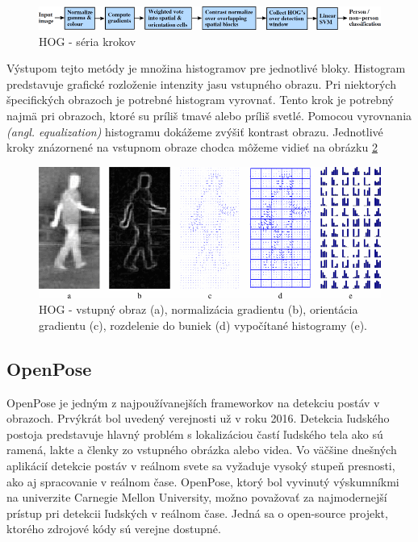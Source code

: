 \documentclass[slovak,master,dept460,male,cpp,cpdeclaration]{diploma}
\begin{document}
\begin{figure}[H]
	\centering
	\includegraphics[width=1\textwidth]{Figures/hog.png}
	\caption{HOG - séria krokov \cite{dalal2005}}
	\label{fig:HOG1}
\end{figure}

Výstupom tejto metódy je množina histogramov pre jednotlivé bloky. Histogram predstavuje grafické rozloženie intenzity jasu vstupného obrazu. Pri niektorých špecifických obrazoch je potrebné histogram vyrovnať. Tento krok je potrebný najmä pri obrazoch, ktoré su príliš tmavé alebo príliš svetlé. Pomocou vyrovnania \textit{(angl. equalization)} histogramu  dokážeme zvýšiť kontrast obrazu. Jednotlivé kroky znázornené na vstupnom obraze chodca môžeme vidieť na obrázku \ref{fig:HOG2}\par


\begin{figure}[H]
	\centering
	\includegraphics[width=1\textwidth]{Figures/hog3.png}
	\caption{HOG - vstupný obraz (a), normalizácia gradientu (b), orientácia gradientu (c), rozdelenie do buniek (d) vypočítané histogramy (e). \cite{bertozzi2007pedestrian}}
	\label{fig:HOG2}
\end{figure}


\newpage
\subsection{OpenPose}
OpenPose\cite{cao2018openpose} je jedným z najpoužívanejších frameworkov na detekciu postáv v obrazoch. Prvýkrát bol uvedený verejnosti už v roku 2016. Detekcia ľudského postoja predstavuje hlavný problém s lokalizáciou častí ľudského tela ako sú ramená, lakte a členky zo vstupného obrázka alebo videa. Vo väčšine dnešných aplikácií detekcie postáv v reálnom svete sa vyžaduje vysoký stupeň presnosti, ako aj spracovanie v reálnom čase.
OpenPose, ktorý bol vyvinutý výskumníkmi na univerzite Carnegie Mellon University, možno považovať za najmodernejší prístup pri detekcii ľudských v reálnom čase. Jedná sa o open-source projekt, ktorého zdrojové kódy sú verejne dostupné\cite{githubOpenpose}.
\end{document}
